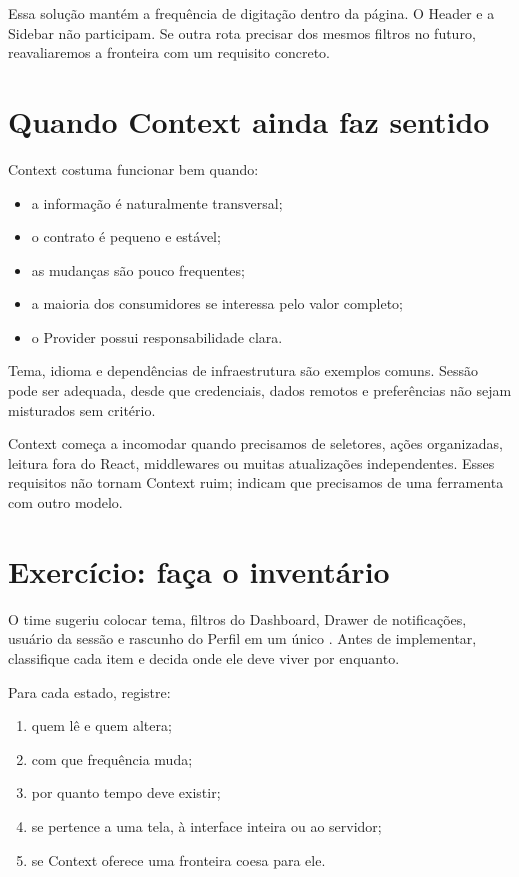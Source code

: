 Essa solução mantém a frequência de digitação dentro da página. O Header e a
Sidebar não participam. Se outra rota precisar dos mesmos filtros no futuro,
reavaliaremos a fronteira com um requisito concreto.

\section{Quando Context ainda faz sentido}

Context costuma funcionar bem quando:

\begin{itemize}
  \item a informação é naturalmente transversal;
  \item o contrato é pequeno e estável;
  \item as mudanças são pouco frequentes;
  \item a maioria dos consumidores se interessa pelo valor completo;
  \item o Provider possui responsabilidade clara.
\end{itemize}

Tema, idioma e dependências de infraestrutura são exemplos comuns. Sessão pode
ser adequada, desde que credenciais, dados remotos e preferências não sejam
misturados sem critério.

Context começa a incomodar quando precisamos de seletores, ações organizadas,
leitura fora do React, middlewares ou muitas atualizações independentes. Esses
requisitos não tornam Context ruim; indicam que precisamos de uma ferramenta
com outro modelo.

\section{Exercício: faça o inventário}

\begin{tarefa}
O time sugeriu colocar tema, filtros do Dashboard, Drawer de notificações,
usuário da sessão e rascunho do Perfil em um único . Antes de
implementar, classifique cada item e decida onde ele deve viver por enquanto.
\end{tarefa}

Para cada estado, registre:

\begin{enumerate}
  \item quem lê e quem altera;
  \item com que frequência muda;
  \item por quanto tempo deve existir;
  \item se pertence a uma tela, à interface inteira ou ao servidor;
  \item se Context oferece uma fronteira coesa para ele.
\end{enumerate}

